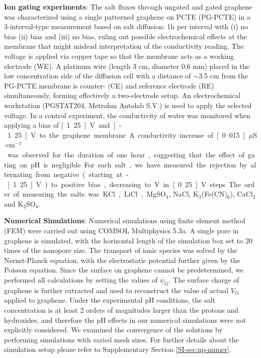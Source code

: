 \vspace{1em}
\noindent
\textbf{Ion gating experiments}: 
{ The salt fluxes through ungated and gated graphene
was characterized using a single patterned graphene on PCTE (PG-PCTE)} 
in a 3-interval-type measurement based on salt diffusion: 1h per interval
with (i) no bias (ii) bias and (iii) no bias, ruling out possible
electrochemical effects at the membrane that might mislead
interpretation of the conductivity reading. The voltage is applied via
copper tape so that the membrane acts as a working electrode (WE). A
platinum wire (length 3 cm, diameter 0.6 mm) placed in the low
concentration side of the diffusion cell with a distance of $\sim$3.5 cm
from the PG-PCTE membrane is counter- (CE) and reference electrode
(RE) simultaneously, forming effectively a two-electrode setup. An
electrochemical workstation (PGSTAT204, Metrohm Autolab S.V.) is used
to apply the selected voltage.
{ In a control experiment, the conductivity of water was monitored when applying a bias of \unit[1.25]{V} and \unit[-1.25]{V} to the graphene membrane. A conductivity increase of \unit[0.015]{$\mu$S$\cdot$cm$^{-1}$} was observed for the duration of one hour, suggesting that the effect of gating on pH is negligible.

  For each salt, we have measured the rejection by alternating from
  negative (starting at -\unit[1.25]{V}) to positive bias, decreasing
  to \unit[0]{V} in \unit[0.25]{V} steps. The order of measuring the
  salts was KCl, LiCl, MgSO$_4$, NaCl, K$_3$(Fe(CN)$_6$), CaCl$_2$ and
  K$_2$SO$_4$.}

\vspace{1em}
\noindent
\textbf{Numerical Simulations}: Numerical simulations using finite
element method (FEM) were carried out using COMSOL Multiphysics
5.3a. A single pore in graphene is simulated, with the horizontal
length of the simulation box set to 20 times of the nanopore size. The
transport of ionic species was solved by the Nernst-Planck equation,
with the electrostatic potential further given by the Poisson
equation. Since the surface on graphene cannot be predetermined, we
performed all calculations by setting the values of
$\psi_{\mathrm{G}}$. The surface charge of graphene is further
extracted and used to reconstruct the value of actual $V_{\mathrm{G}}$
applied to graphene. 
{
Under the experimental pH conditions, the salt concentration is at least 2 orders of magnitudes larger than the protons and hydroxides, and therefore the pH effects in our numerical simulations were not explicitly considered.
}
We examined the convergence of the solutions by
performing simulations with varied mesh sizes. For further details
about the simulation setup please refer to Supplementary Section
\autoref{SI-sec:np-numer}.



